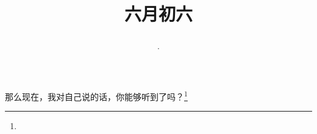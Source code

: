 \title{\date[d=11,m=7,y=2024][year:cn-y,年,month:cn,day:cn,日,·,weekday]·六月初六 }
那么现在，我对自己说的话，你能够听到了吗？\footnote{ }

